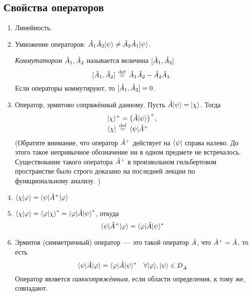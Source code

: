 \subsection{Свойства операторов}
\begin{enumerate}
  \item Линейность.
  \item Умножение операторов: $\Hat A_1 \Hat A_2 | \psi \rangle \neq \Hat A_2 \Hat A_1 | \psi \rangle$.

  \Def \emph{Коммутатором} $\Hat A_1, \Hat A_2$ называется величина $[\Hat A_1, \Hat A_2]$
  $$
    [\Hat A_1, \Hat A_2] \,\overset{\mathrm{def}}{=}\, \Hat A_1 \Hat A_2 - \Hat A_2 \Hat A_1.
  $$
  Если операторы коммутируют, то $[\Hat A_1, \Hat A_2] = 0$.
  \item Оператор, эрмитово сопряжённый данному.
  Пусть $\Hat A | \psi \rangle = | \chi \rangle$. Тогда
  $$
  \begin{array}{l}
    | \chi \rangle ^+ = \big(\Hat A | \psi \rangle\big)^+, \\
    \langle \chi | \,\overset{\mathrm{def}}{=}\, \langle \psi | \Hat A^+
  \end{array}
  $$
  (Обратите внимание, что оператор $\Hat A^+$ действует на $\langle \psi |$ справа налево. До этого такое непривычное обозначение ни в одном предмете не встречалось. Существование такого оператора $\Hat A^+$ в произвольном гильбертовом пространстве было строго доказано на последней лекции по функциональному анализу. \Alex)
  \item $\langle \chi | \varphi \rangle = \langle \psi | \Hat A^+ | \varphi \rangle$
  \item $\langle \chi | \varphi \rangle = {\langle \varphi | \chi \rangle}^\ast = \langle \varphi | \Hat A {| \psi \rangle}^\ast$, откуда
  $$
    \langle \psi | \Hat A^+ | \varphi \rangle = \langle \varphi | \Hat A | \psi \rangle ^\ast
  $$
  \item \Def Эрмитов (симметричный) оператор~--- это такой оператор $\Hat A$, что $\Hat A^+ = \Hat A$, то есть
  $$
    \langle \psi | \Hat A | \varphi \rangle = \langle \varphi | \Hat A | \psi \rangle ^\ast \quad \forall | \varphi \rangle, | \psi \rangle \in D_{\Hat A}
  $$
  \Def Оператор является \emph{самосопряжённым}, если области определения, к тому же, совпадают.
\end{enumerate}
